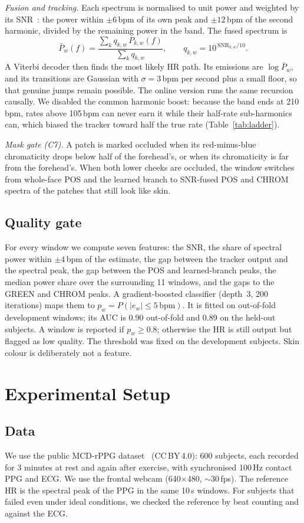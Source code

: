\documentclass[conference]{IEEEtran}
\newcommand{\bpm}{\,bpm}
\begin{document}
\textit{Fusion and tracking.} Each spectrum is normalised to unit power and weighted by its
SNR~\cite{dehaan2013}: the power within $\pm6$\bpm{} of its own peak and $\pm12$\bpm{} of the second
harmonic, divided by the remaining power in the band. The fused spectrum is
\begin{equation}
\bar P_w(f)=\frac{\sum_k q_{k,w}\,P_{k,w}(f)}{\sum_k q_{k,w}},\qquad q_{k,w}=10^{\,\mathrm{SNR}_{k,w}/10}.
\end{equation}
A Viterbi decoder then finds the most likely HR path. Its emissions are $\log\bar P_w$, and its transitions are Gaussian
with $\sigma=3$\bpm{} per second plus a small floor, so that genuine jumps remain possible. The online
version runs the same recursion causally. We disabled the common harmonic boost: because the
band ends at 210\bpm, rates above 105\bpm{} can never earn it while their half-rate sub-harmonics can,
which biased the tracker toward half the true rate (Table~\ref{tab:ladder}).

\textit{Mask gate (C7).} A patch is marked occluded when its red-minus-blue chromaticity drops below
half of the forehead's, or when its chromaticity is far from the forehead's. When both lower cheeks are
occluded, the window switches from whole-face POS and the learned branch to SNR-fused POS and CHROM
spectra of the patches that still look like skin.

\subsection{Quality gate}
For every window we compute seven features: the SNR, the share of spectral power within $\pm4$\bpm{} of
the estimate, the gap between the tracker output and the spectral peak, the gap between the POS and
learned-branch peaks, the median power share over the surrounding 11 windows, and the gaps to the GREEN
and CHROM peaks. A gradient-boosted classifier (depth~3, 200 iterations) maps them to
$p_w=P(|e_w|\le5\,\mathrm{bpm})$. It is fitted on out-of-fold development windows; its AUC is 0.90 out-of-fold and 0.89 on the
held-out subjects. A window is reported if $p_w\ge0.8$; otherwise the HR is still output but flagged as low quality.
The threshold was fixed on the development subjects. Skin colour is deliberately not a feature.

\section{Experimental Setup}
\subsection{Data}
We use the public MCD-rPPG dataset~\cite{egorov2025} (CC\,BY\,4.0): 600 subjects, each recorded for
3 minutes at rest and again after exercise, with synchronised 100\,Hz contact PPG and ECG. We use the
frontal webcam (640$\times$480, ${\sim}30$\,fps). The reference HR is the spectral peak of the PPG in the
same 10\,s windows. For subjects that failed even under ideal conditions, we checked the reference by
beat counting and against the ECG.
\end{document}
